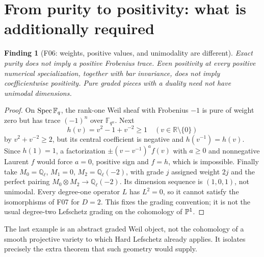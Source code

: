 \documentclass[11pt,a4paper]{article}
\newcommand{\Q}{\mathbb Q}\newcommand{\Z}{\mathbb Z}\newcommand{\C}{\mathbb C}\newcommand{\N}{\mathbb N}\newcommand{\F}{\mathbb F}
\newcommand{\fid}[1]{\textsf{#1}}\newcommand{\gate}[1]{\textsf{#1}}
\theoremstyle{named}\newtheorem{finding}{Finding}[section]
\theoremstyle{definition}\newtheorem{definition}[finding]{Definition}
\theoremstyle{remark}\newtheorem{remark}[finding]{Remark}
\begin{document}
\section{From purity to positivity: what is additionally required}\label{sec:positivity}
\begin{finding}[\fid{F06}: weights, positive values, and unimodality are different]\label{f:phase}
Exact purity does not imply a positive Frobenius trace. Even positivity at every positive numerical specialization, together with bar invariance, does not imply coefficientwise positivity. Pure graded pieces with a duality need not have unimodal dimensions.
\end{finding}
\begin{proof}
On $\Spec\F_q$, the rank-one Weil sheaf with Frobenius $-1$ is pure of weight zero but has trace $(-1)^n$ over $\F_{q^n}$. Next
\[
 h(v)=v^2-1+v^{-2}\ge1\quad(v\in\mathbb R\setminus\{0\})
\]
by $v^2+v^{-2}\ge2$, but its central coefficient is negative and $h(v^{-1})=h(v)$. Since $h(1)=1$, a factorization $\pm(v-v^{-1})^a f(v)$ with $a\ge0$ and nonnegative Laurent $f$ would force $a=0$, positive sign and $f=h$, which is impossible. Finally take $M_0=\Q_\ell$, $M_1=0$, $M_2=\Q_\ell(-2)$, with grade $j$ assigned weight $2j$ and the perfect pairing $M_0\otimes M_2\to\Q_\ell(-2)$. Its dimension sequence is $(1,0,1)$, not unimodal. Every degree-one operator $L$ has $L^2=0$, so it cannot satisfy the isomorphisms of \fid{F07} for $D=2$. This fixes the grading convention; it is not the usual degree-two Lefschetz grading on the cohomology of $\mathbb P^1$.
\end{proof}
The last example is an abstract graded Weil object, not the cohomology of a smooth projective variety to which Hard Lefschetz already applies. It isolates precisely the extra theorem that such geometry would supply.
\end{document}
